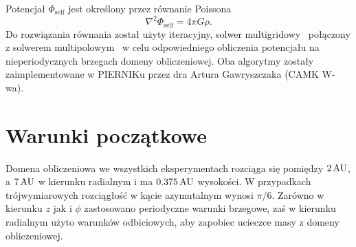 \par Potencjał $\Phi_{\textrm{self}}$ jest określony przez równanie Poissona
\begin{equation}\label{eq:poisson}
   \nabla^2 \Phi_{\textrm{self}} = 4\pi G \rho.
\end{equation}
Do rozwiązania równania  został użyty iteracyjny, solwer
multigridowy~\citep{HG00} połączony z solwerem multipolowym~\citep{J77} w celu
odpowiedniego obliczenia potencjału na nieperiodycznych brzegach domeny
obliczeniowej. Oba algorytmy zostały zaimplementowane w PIERNIKu przez dra
Artura Gawryszczaka (CAMK W-wa).

\section{Warunki początkowe}
Domena obliczeniowa we wszystkich eksperymentach rozciąga się pomiędzy $2\hbox{$\thinspace\textrm{AU}$}$, a
$7\hbox{$\thinspace\textrm{AU}$}$ w kierunku radialnym i ma $0.375\hbox{$\thinspace\textrm{AU}$}$ wysokości. W przypadkach
trójwymiarowych rozciągłość w kącie azymutalnym wynosi $\pi / 6$.
Zarówno w kierunku $z$ jak i $\phi$ zastosowano periodyczne warunki brzegowe,
zaś w kierunku radialnym użyto warunków odbiciowych, aby zapobiec ucieczce masy
z domeny obliczeniowej.

